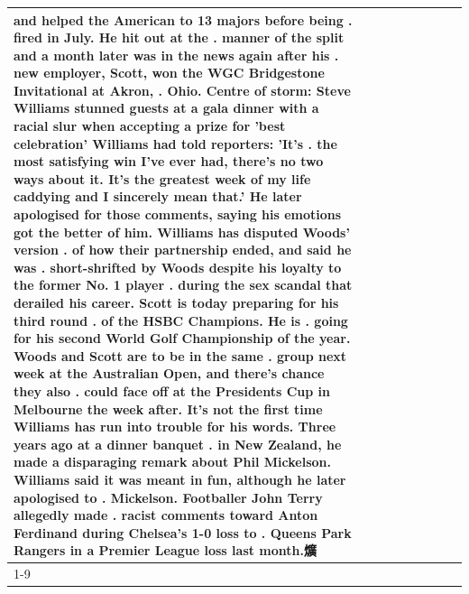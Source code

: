 \begin{table}[H]
\begin{tabular}{lllrlllll}
and helped the American to 13 majors before being . fired in July. He hit out at the . manner of the split and a month later was in the news again after his . new employer, Scott, won the WGC Bridgestone Invitational at Akron, . Ohio. Centre of storm: Steve Williams stunned guests at a gala dinner with a racial slur when accepting a prize for 'best celebration' Williams had told reporters: 'It's . the most satisfying win I've ever had, there's no two ways about it. It's the greatest week of my life caddying and I sincerely mean that.' He later apologised for those comments, saying his emotions got the better of him. Williams has disputed Woods' version . of how their partnership ended, and said he was . short-shrifted by Woods despite his loyalty to the former No. 1 player . during the sex scandal that derailed his career. Scott is today preparing for his third round . of the HSBC Champions. He is . going for his second World Golf Championship of the year. Woods and Scott are to be in the same . group next week at the Australian Open, and there's chance they also . could face off at the Presidents Cup in Melbourne the week after. It's not the first time Williams has run into trouble for his words. Three years ago at a dinner banquet . in New Zealand, he made a disparaging remark about Phil Mickelson. Williams said it was meant in fun, although he later apologised to . Mickelson. Footballer John Terry allegedly made . racist comments toward Anton Ferdinand during Chelsea's 1-0 loss to . Queens Park Rangers in a Premier League loss last month.爌 \\
\cline{1-9}

\end{tabular}
\end{table}

